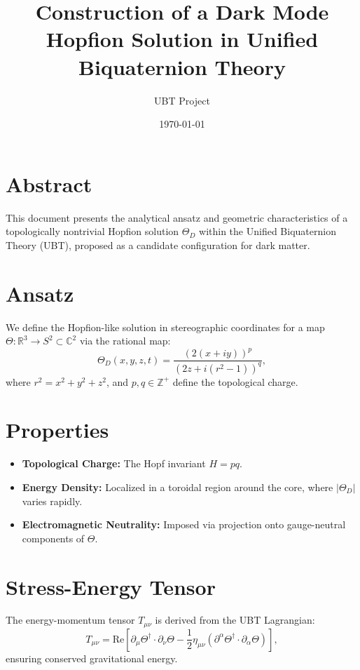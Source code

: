 \documentclass[12pt]{article}
\title{Construction of a Dark Mode Hopfion Solution in Unified Biquaternion Theory}
\author{UBT Project}
\date{\today}
\begin{document}
\maketitle


\SpeculativeContentWarning

\section*{Abstract}
This document presents the analytical ansatz and geometric characteristics of a topologically nontrivial Hopfion solution \(\Theta_D\) within the Unified Biquaternion Theory (UBT), proposed as a candidate configuration for dark matter.

\section{Ansatz}
We define the Hopfion-like solution in stereographic coordinates for a map \( \Theta : \mathbb{R}^3 \to S^2 \subset \mathbb{C}^2 \) via the rational map:
\[
\Theta_D(x, y, z, t) = \frac{(2(x+iy))^p}{(2z + i(r^2 - 1))^q},
\]
where \( r^2 = x^2 + y^2 + z^2 \), and \(p, q \in \mathbb{Z}^+\) define the topological charge.

\section{Properties}
\begin{itemize}
    \item \textbf{Topological Charge:} The Hopf invariant \(H = pq\).
    \item \textbf{Energy Density:} Localized in a toroidal region around the core, where \(|\Theta_D|\) varies rapidly.
    \item \textbf{Electromagnetic Neutrality:} Imposed via projection onto gauge-neutral components of \(\Theta\).
\end{itemize}

\section{Stress-Energy Tensor}
The energy-momentum tensor \(T_{\mu\nu}\) is derived from the UBT Lagrangian:
\[
T_{\mu\nu} = \text{Re} \left[ \partial_\mu \Theta^\dagger \cdot \partial_\nu \Theta - \frac{1}{2} \eta_{\mu\nu} \left( \partial^\alpha \Theta^\dagger \cdot \partial_\alpha \Theta \right) \right],
\]
ensuring conserved gravitational energy.
\end{document}
